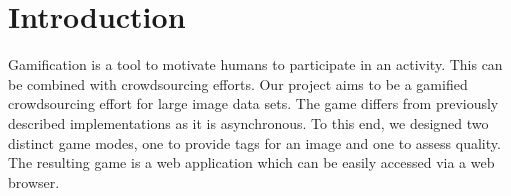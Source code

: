 \section{Introduction}
\label{gXLII:sec:introduction}

Gamification is a tool to motivate humans to participate in an activity. This can be combined with crowdsourcing efforts. Our project aims to be a gamified crowdsourcing effort for large image data sets. The game differs from previously described implementations as it is asynchronous. To this end, we designed two distinct game modes, one to provide tags for an image and one to assess quality. The resulting game is a web application which can be easily accessed via a web browser.


